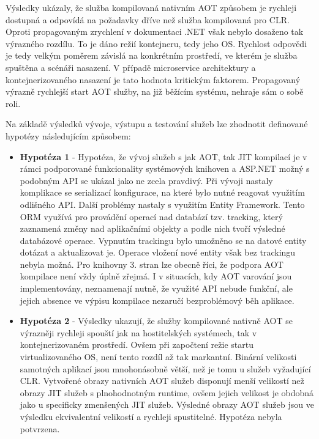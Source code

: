 Výsledky ukázaly, že služba kompilovaná nativním AOT způsobem je rychleji dostupná a odpovídá na požadavky dříve než služba kompilovaná pro CLR. Oproti propagovaným zrychlení v dokumentaci .NET však nebylo dosaženo tak výrazného rozdílu. To je dáno režií kontejneru, tedy jeho OS. Rychlost odpovědi je tedy velkým poměrem závislá na konkrétním prostředí, ve kterém je služba spuštěna a scénáři nasazení. V případě microservice architektury a kontejnerizovaného nasazení je tato hodnota kritickým faktorem. Propagovaný výrazně rychlejší start AOT služby, na již běžícím systému, nehraje sám o sobě roli.


Na základě výsledků vývoje, výstupu a testování služeb lze zhodnotit definované hypotézy následujícím způsobem:

\begin{itemize}
  \item \textbf{Hypotéza 1} - Hypotéza, že vývoj služeb s jak AOT, tak JIT kompilací je v rámci podporované funkcionality systémových knihoven a ASP.NET možný s podobným API se ukázal jako ne zcela pravdivý. Při vývoji nastaly komplikace se serializací konfigurace, na které bylo nutné reagovat využitím odlišného API. Další problémy nastaly s využitím Entity Framework. Tento ORM využívá pro provádění operací nad databází tzv. tracking, který zaznamená změny nad aplikačními objekty a podle nich tvoří výsledné databázové operace. Vypnutím trackingu bylo umožněno se na datové entity dotázat a aktualizovat je. Operace vložení nové entity však bez trackingu nebyla možná. Pro knihovny 3. stran lze obecně říci, že podpora AOT kompilace není vždy úplně zřejmá. I v situacích, kdy AOT varování jsou implementovány, neznamenají nutně, že využité API nebude funkční, ale jejich absence ve výpisu kompilace nezaručí bezproblémový běh aplikace.
  \item \textbf{Hypotéza 2} - Výsledky ukazují, že služby kompilované nativně AOT se výrazněji rychleji spouští jak na hostitelských systémech, tak v kontejnerizovaném prostředí. Ovšem při započtení režie startu virtualizovaného OS, není tento rozdíl až tak markantní. Binární velikosti samotných aplikací jsou mnohonásobně větší, než je tomu u služeb vyžadující CLR. Vytvořené obrazy nativních AOT služeb disponují menší velikostí než obrazy JIT služeb s plnohodnotným runtime, ovšem jejich velikost je obdobná jako u specificky zmenšených JIT služeb. Výsledné obrazy AOT služeb jsou ve výsledku ekvivalentní velikostí a rychleji spustitelné. Hypotéza nebyla potvrzena.

\end{itemize}
